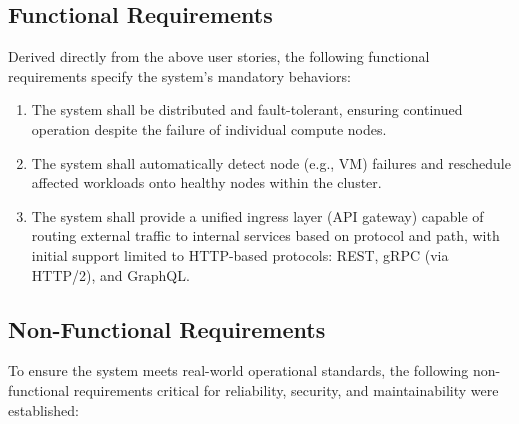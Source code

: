 \subsection{Functional Requirements}

Derived directly from the above user stories, the following functional requirements specify the system’s mandatory behaviors:

\begin{enumerate}[label=\textbf{FR\arabic*.}, left=0pt]

\item The system shall be distributed and fault-tolerant, ensuring continued operation despite the failure of individual compute nodes.

\item The system shall automatically detect node (e.g., VM) failures and reschedule affected workloads onto healthy nodes within the cluster.

\item The system shall provide a unified ingress layer (API gateway) capable of routing external traffic to internal services based on protocol and path, with initial support limited to HTTP-based protocols: REST, gRPC (via HTTP/2), and GraphQL.

\end{enumerate}

\subsection{Non-Functional Requirements}

To ensure the system meets real-world operational standards, the following non-functional requirements critical for reliability, security, and maintainability were established:

